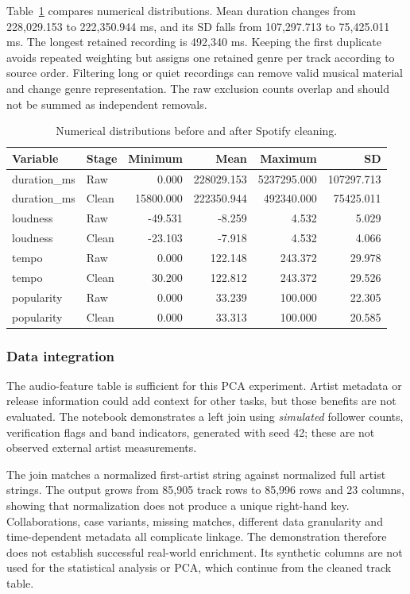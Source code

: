 \documentclass[12pt, a4paper]{article}
\begin{document}
Table~\ref{tab:spotify-before-after} compares numerical distributions. Mean duration changes from 228,029.153 to 222,350.944 ms, and its SD falls from 107,297.713 to 75,425.011 ms. The longest retained recording is 492,340 ms. Keeping the first duplicate avoids repeated weighting but assigns one retained genre per track according to source order. Filtering long or quiet recordings can remove valid musical material and change genre representation. The raw exclusion counts overlap and should not be summed as independent removals.
\begin{table}[htbp]
\centering\small
\setlength{\tabcolsep}{4pt}\renewcommand{\arraystretch}{1.12}
\caption{Numerical distributions before and after Spotify cleaning.}
\label{tab:spotify-before-after}
\begin{tabular}{llrrrr}
\toprule
\textbf{Variable} & \textbf{Stage} & \textbf{Minimum} & \textbf{Mean} & \textbf{Maximum} & \textbf{SD} \tabularnewline
\midrule
duration\_ms & Raw & 0.000 & 228029.153 & 5237295.000 & 107297.713 \tabularnewline
duration\_ms & Clean & 15800.000 & 222350.944 & 492340.000 & 75425.011 \tabularnewline
loudness & Raw & -49.531 & -8.259 & 4.532 & 5.029 \tabularnewline
loudness & Clean & -23.103 & -7.918 & 4.532 & 4.066 \tabularnewline
tempo & Raw & 0.000 & 122.148 & 243.372 & 29.978 \tabularnewline
tempo & Clean & 30.200 & 122.812 & 243.372 & 29.526 \tabularnewline
popularity & Raw & 0.000 & 33.239 & 100.000 & 22.305 \tabularnewline
popularity & Clean & 0.000 & 33.313 & 100.000 & 20.585 \tabularnewline
\bottomrule
\end{tabular}
\par{}
\end{table}

\subsubsection{Data integration}
The audio-feature table is sufficient for this PCA experiment. Artist metadata or release information could add context for other tasks, but those benefits are not evaluated. The notebook demonstrates a left join using \emph{simulated} follower counts, verification flags and band indicators, generated with seed 42; these are not observed external artist measurements.

The join matches a normalized first-artist string against normalized full artist strings. The output grows from 85,905 track rows to 85,996 rows and 23 columns, showing that normalization does not produce a unique right-hand key. Collaborations, case variants, missing matches, different data granularity and time-dependent metadata all complicate linkage. The demonstration therefore does not establish successful real-world enrichment. Its synthetic columns are not used for the statistical analysis or PCA, which continue from the cleaned track table.
\end{document}
